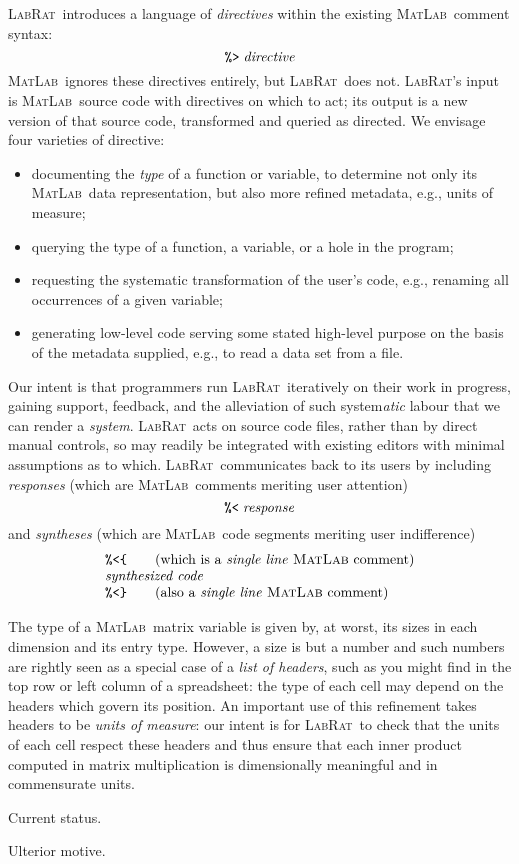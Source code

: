 \documentclass{article}
\newcommand{\pct}{\texttt{\symbol{37}}}
\newcommand{\dir}{\texttt{\symbol{62}}}
\newcommand{\res}{\texttt{\symbol{60}}}
\newcommand{\lcb}{\texttt{\symbol{123}}}
\newcommand{\rcb}{\texttt{\symbol{125}}}
\newcommand{\lr}{\textsc{LabRat}}
\newcommand{\ma}{\textsc{MatLab}}
\newcommand{\remph}{\emph}
\begin{document}
\lr\ introduces a language of \emph{directives} within the existing \ma\ comment syntax:
\[\pct\dir\;\mathit{directive}
\]
\ma\ ignores these directives entirely, but \lr\ does not. \lr's input is \ma\ source code with directives on which to act; its output is a new version of that source code, transformed and queried as directed. We envisage four varieties of directive:
\begin{itemize}
\item documenting the \remph{type} of a function or variable, to determine not only its \ma\ data representation, but also more refined metadata, e.g., units of measure;
\item querying the type of a function, a variable, or a hole in the program;
\item requesting the systematic transformation of the user's code, e.g., renaming all occurrences of a given variable;
\item generating low-level code serving some stated high-level purpose on the basis of the metadata supplied, e.g., to read a data set from a file.
\end{itemize}
Our intent is that programmers run \lr\ iteratively on their work in progress, gaining support, feedback, and the alleviation of such system\remph{atic} labour that we can render a \remph{system}. \lr\ acts on source code files, rather than by direct manual controls, so may readily be integrated with existing editors with minimal assumptions as to which. \lr\ communicates back to its users by including \emph{responses} (which are \ma\ comments meriting user attention)
\[
\pct\res\;\mathit{response}
\]
and \emph{syntheses} (which are \ma\ code segments meriting user indifference)
\[\begin{array}{l}
\pct\res\lcb\qquad \mbox{(which is a \remph{single line} \ma\ comment)}\\
\mathit{synthesized}\; \mathit{code}\\
\pct\res\rcb\qquad \mbox{(also a \remph{single line} \ma\ comment)} \\
\end{array}\]

The type of a \ma\ matrix variable is given by, at worst, its sizes in each dimension and its entry type. However, a size is but a number and such numbers are rightly seen as a special case of a \remph{list of headers}, such as you might find in the top row or left column of a spreadsheet: the type of each cell may depend on the headers which govern its position. An important use of this refinement takes headers to be \remph{units of measure}: our intent is for \lr\ to check that the units of each cell respect these headers and thus ensure that each inner product computed in matrix multiplication is dimensionally meaningful and in commensurate units.

Current status.

Ulterior motive.
\end{document}
